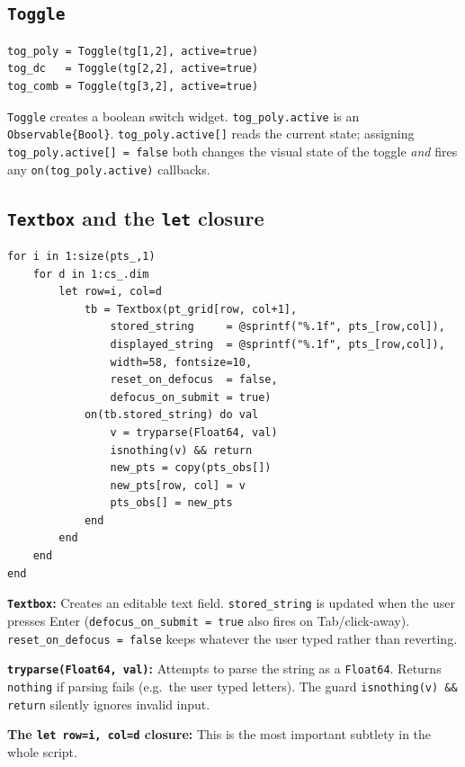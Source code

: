 \documentclass[12pt, a4paper]{article}
\newcommand{\cd}[1]{\texttt{#1}}
\begin{document}
\subsection{\texttt{Toggle}}

\begin{verbatim}
tog_poly = Toggle(tg[1,2], active=true)
tog_dc   = Toggle(tg[2,2], active=true)
tog_comb = Toggle(tg[3,2], active=true)
\end{verbatim}

\cd{Toggle} creates a boolean switch widget.
\cd{tog\_poly.active} is an \cd{Observable\{Bool\}}.
\cd{tog\_poly.active[]} reads the current state;
assigning \cd{tog\_poly.active[] = false} both changes
the visual state of the toggle \emph{and} fires any
\cd{on(tog\_poly.active)} callbacks.

\subsection{\texttt{Textbox} and the \texttt{let} closure}

\begin{verbatim}
for i in 1:size(pts_,1)
    for d in 1:cs_.dim
        let row=i, col=d
            tb = Textbox(pt_grid[row, col+1],
                stored_string     = @sprintf("%.1f", pts_[row,col]),
                displayed_string  = @sprintf("%.1f", pts_[row,col]),
                width=58, fontsize=10,
                reset_on_defocus  = false,
                defocus_on_submit = true)
            on(tb.stored_string) do val
                v = tryparse(Float64, val)
                isnothing(v) && return
                new_pts = copy(pts_obs[])
                new_pts[row, col] = v
                pts_obs[] = new_pts
            end
        end
    end
end
\end{verbatim}

\textbf{\cd{Textbox}:}
Creates an editable text field.
\cd{stored\_string} is updated when the user presses Enter
(\cd{defocus\_on\_submit = true} also fires on Tab/click-away).
\cd{reset\_on\_defocus = false} keeps whatever the user
typed rather than reverting.

\textbf{\cd{tryparse(Float64, val)}:}
Attempts to parse the string as a \cd{Float64}.
Returns \cd{nothing} if parsing fails (e.g.\ the user
typed letters).
The guard \cd{isnothing(v) \&\& return} silently ignores
invalid input.

\textbf{The \cd{let row=i, col=d} closure:}
This is the most important subtlety in the whole script.
\end{document}

